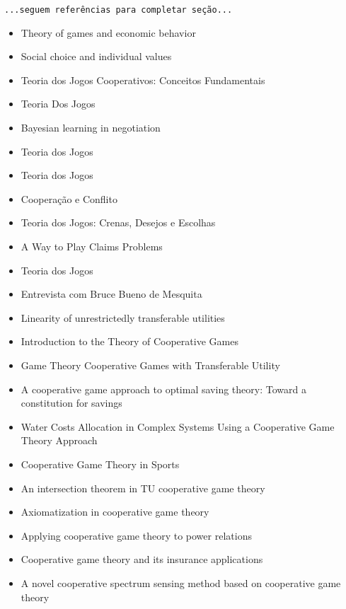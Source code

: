 \documentclass[
	article,			        %
	11pt,				          %
	oneside,			        %
	a4paper,			        %
	english,			        %
	brazil,				        %
	sumario=tradicional
]{abntex2}\usepackage[]{graphicx}\usepackage[]{color}
\begin{document}
  \texttt{\color{red}...seguem referências para completar seção...}
  \begin{itemize}
    \item Theory of games and economic behavior \cite{Neumann.1947}
    \item Social choice and individual values \cite{Figueiredo.1994}
    \item Teoria dos Jogos Cooperativos: Conceitos Fundamentais \cite{Moreira.2002}
    \item Teoria Dos Jogos \cite{Fiani.2006}
    \item Bayesian learning in negotiation \cite{Zeng.1998}
    \item Teoria dos Jogos \cite{Tavares.2009}
    \item Teoria dos Jogos \cite{Bierman.2010}
    \item Cooperação e Conflito \cite{Fiani.2011}
    \item Teoria dos Jogos: Crenas, Desejos e Escolhas \cite{Paula.2014}
    \item A Way to Play Claims Problems \cite{Gimenez.2014}
    \item Teoria dos Jogos \cite{Fiani.2015}
    \item Entrevista com Bruce Bueno de Mesquita \cite{Mesquita.2012}
    \item Linearity of unrestrictedly transferable utilities \cite{Aumann.1960}
    \item Introduction to the Theory of Cooperative Games \cite{Peleg.2007}
    \item Game Theory Cooperative Games with Transferable Utility \cite{Peters.2008}
    \item A cooperative game approach to optimal saving theory: Toward a constitution for savings \cite{Forte.1994}
    \item Water Costs Allocation in Complex Systems Using a Cooperative Game Theory Approach \cite{Sechi.2013}
    \item Cooperative Game Theory in Sports \cite{Manuel.2013}
    \item An intersection theorem in TU cooperative game theory \cite{Albeniz.2004}
    \item Axiomatization in cooperative game theory \cite{yakov.2005}
    \item Applying cooperative game theory to power relations \cite{Wiese.2009}
    \item Cooperative game theory and its insurance applications \cite{Lemaire.1993}
    \item A novel cooperative spectrum sensing method based on cooperative game theory \cite{KaitianCao.2010}

\end{itemize}
\end{document}
